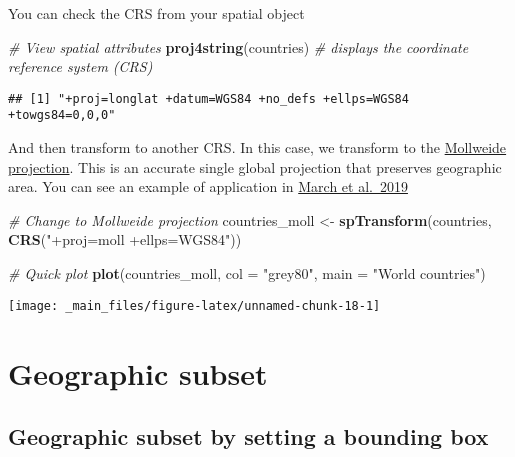 \documentclass[]{book}
\newenvironment{Shaded}{\begin{snugshade}}{\end{snugshade}}
\newcommand{\CommentTok}[1]{\textcolor[rgb]{0.56,0.35,0.01}{\textit{#1}}}
\newcommand{\DataTypeTok}[1]{\textcolor[rgb]{0.13,0.29,0.53}{#1}}
\newcommand{\KeywordTok}[1]{\textcolor[rgb]{0.13,0.29,0.53}{\textbf{#1}}}
\newcommand{\NormalTok}[1]{#1}
\newcommand{\StringTok}[1]{\textcolor[rgb]{0.31,0.60,0.02}{#1}}
\begin{document}
You can check the CRS from your spatial object

\begin{Shaded}
\begin{Highlighting}[]
\CommentTok{# View spatial attributes}
\KeywordTok{proj4string}\NormalTok{(countries)  }\CommentTok{# displays the coordinate reference system (CRS)}
\end{Highlighting}
\end{Shaded}

\begin{verbatim}
## [1] "+proj=longlat +datum=WGS84 +no_defs +ellps=WGS84 +towgs84=0,0,0"
\end{verbatim}

And then transform to another CRS. In this case, we transform to the \href{https://en.wikipedia.org/wiki/Mollweide_projection}{Mollweide projection}. This is an accurate single global projection that preserves geographic area. You can see an example of application in \href{https://doi.org/10.1111/gcb.14902}{March et al.~2019}

\begin{Shaded}
\begin{Highlighting}[]
\CommentTok{# Change to Mollweide projection}
\NormalTok{countries_moll <-}\StringTok{ }\KeywordTok{spTransform}\NormalTok{(countries, }\KeywordTok{CRS}\NormalTok{(}\StringTok{"+proj=moll +ellps=WGS84"}\NormalTok{))}

\CommentTok{# Quick plot}
\KeywordTok{plot}\NormalTok{(countries_moll, }\DataTypeTok{col =} \StringTok{"grey80"}\NormalTok{, }\DataTypeTok{main =} \StringTok{"World countries"}\NormalTok{)}
\end{Highlighting}
\end{Shaded}

\begin{center}\texttt{[image: \_main\_files/figure-latex/unnamed-chunk-18-1]} \end{center}

\hypertarget{geographic-subset}{%
\section{Geographic subset}\label{geographic-subset}}

\hypertarget{geographic-subset-by-setting-a-bounding-box}{%
\subsection{Geographic subset by setting a bounding box}\label{geographic-subset-by-setting-a-bounding-box}}
\end{document}
